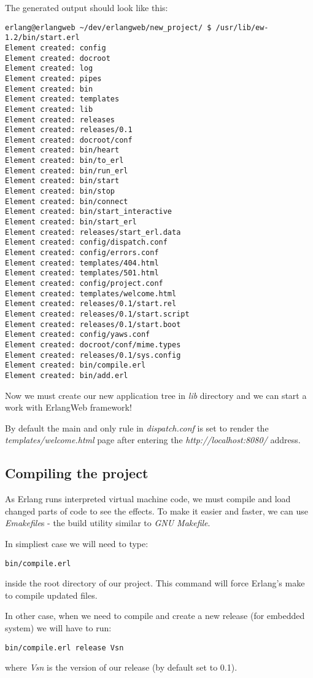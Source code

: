The generated output should look like this:
\begin{verbatim}
erlang@erlangweb ~/dev/erlangweb/new_project/ $ /usr/lib/ew-1.2/bin/start.erl
Element created: config
Element created: docroot
Element created: log
Element created: pipes
Element created: bin
Element created: templates
Element created: lib
Element created: releases
Element created: releases/0.1
Element created: docroot/conf
Element created: bin/heart
Element created: bin/to_erl
Element created: bin/run_erl
Element created: bin/start
Element created: bin/stop
Element created: bin/connect
Element created: bin/start_interactive
Element created: bin/start_erl
Element created: releases/start_erl.data
Element created: config/dispatch.conf
Element created: config/errors.conf
Element created: templates/404.html
Element created: templates/501.html
Element created: config/project.conf
Element created: templates/welcome.html
Element created: releases/0.1/start.rel
Element created: releases/0.1/start.script
Element created: releases/0.1/start.boot
Element created: config/yaws.conf
Element created: docroot/conf/mime.types
Element created: releases/0.1/sys.config
Element created: bin/compile.erl
Element created: bin/add.erl
\end{verbatim}

Now we must create our new application tree in {\it lib} directory and we can start a work with ErlangWeb framework!

By default the main and only rule in {\it dispatch.conf} is set to render the {\it templates/welcome.html} page after entering the {\it http://localhost:8080/} address.

\subsection{Compiling the project}As Erlang runs interpreted virtual machine code, we must compile and load changed parts of code to see the effects. To make it easier and faster, we can use {\it Emakefile}s - the build utility similar to {\it GNU Makefile}.

In simpliest case we will need to type:
\begin{verbatim}
bin/compile.erl
\end{verbatim}
inside the root directory of our project. This command will force Erlang's make to compile updated files. 

In other case, when we need to compile and create a new release (for embedded system) we will have to run:
\begin{verbatim}
bin/compile.erl release Vsn
\end{verbatim}
where {\it Vsn} is the version of our release (by default set to 0.1). 

